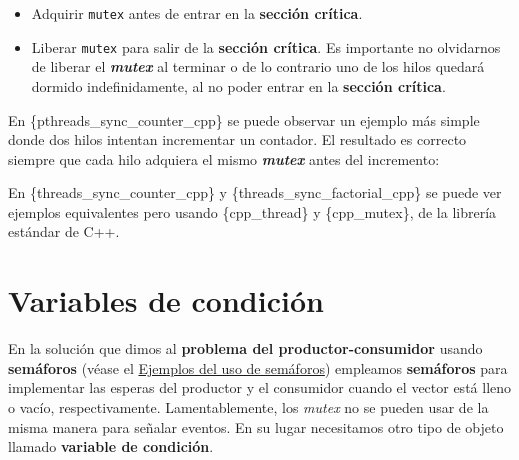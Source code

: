 \begin{itemize}
\item
  Adquirir \texttt{mutex} antes de entrar en la \textbf{sección
  crítica}.
\item
  Liberar \texttt{mutex} para salir de la \textbf{sección crítica}. Es
  importante no olvidarnos de liberar el \textbf{\emph{mutex}} al
  terminar o de lo contrario uno de los hilos quedará dormido
  indefinidamente, al no poder entrar en la \textbf{sección crítica}.
\end{itemize}

En \{pthreads\_sync\_counter\_cpp\} se puede observar un ejemplo más
simple donde dos hilos intentan incrementar un contador. El resultado es
correcto siempre que cada hilo adquiera el mismo \textbf{\emph{mutex}}
antes del incremento:

\begin{Shaded}
\begin{Highlighting}[]
\OperatorTok{(} \OperatorTok{\&}\OperatorTok{{-}\textgreater{}}\OperatorTok{);}
\OperatorTok{{-}\textgreater{}}\OperatorTok{++;}
\OperatorTok{(} \OperatorTok{\&}\OperatorTok{{-}\textgreater{}}\OperatorTok{);}
\end{Highlighting}
\end{Shaded}

En \{threads\_sync\_counter\_cpp\} y \{threads\_sync\_factorial\_cpp\}
se puede ver ejemplos equivalentes pero usando \{cpp\_thread\} y
\{cpp\_mutex\}, de la librería estándar de C++.

\section{Variables de condición}\label{_variables_de_condiciuxf3n}

{} En la solución que dimos al \textbf{problema del
productor-consumidor} usando \textbf{semáforos} (véase el
\hyperref[_ejemplos_del_uso_de_semuxe1foros]{Ejemplos del uso de
semáforos}) empleamos \textbf{semáforos} para implementar las esperas
del productor y el consumidor cuando el vector está lleno o vacío,
respectivamente. Lamentablemente, los \emph{mutex} no se pueden usar de
la misma manera para señalar eventos. En su lugar necesitamos otro tipo
de objeto llamado \textbf{variable de condición}.

